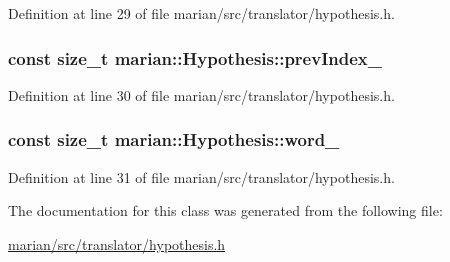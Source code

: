 Definition at line 29 of file marian/src/translator/hypothesis.\+h.

\subsubsection[{\texorpdfstring{prev\+Index\+\_\+}{prevIndex_}}]{\setlength{\rightskip}{0pt plus 5cm}const size\+\_\+t marian\+::\+Hypothesis\+::prev\+Index\+\_\+\hspace{0.3cm}{\ttfamily [private]}}\hypertarget{classmarian_1_1Hypothesis_a84c448603601d1211175d07aece5a5cb}{}\label{classmarian_1_1Hypothesis_a84c448603601d1211175d07aece5a5cb}


Definition at line 30 of file marian/src/translator/hypothesis.\+h.

\subsubsection[{\texorpdfstring{word\+\_\+}{word_}}]{\setlength{\rightskip}{0pt plus 5cm}const size\+\_\+t marian\+::\+Hypothesis\+::word\+\_\+\hspace{0.3cm}{\ttfamily [private]}}\hypertarget{classmarian_1_1Hypothesis_af6a592017f00d65952995901371c6ebf}{}\label{classmarian_1_1Hypothesis_af6a592017f00d65952995901371c6ebf}


Definition at line 31 of file marian/src/translator/hypothesis.\+h.



The documentation for this class was generated from the following file\+:\begin{DoxyCompactItemize}
\item 
\hyperlink{marian_2src_2translator_2hypothesis_8h}{marian/src/translator/hypothesis.\+h}\end{DoxyCompactItemize}

